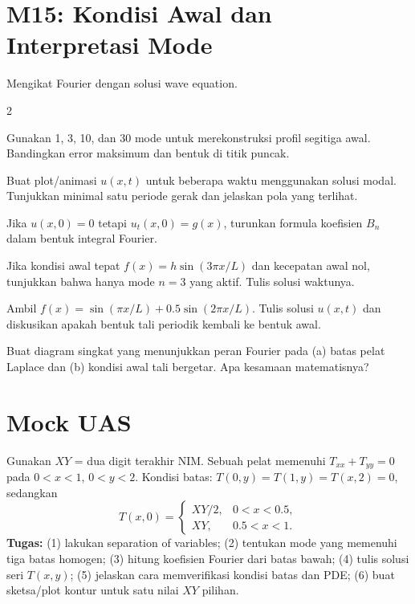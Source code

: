 \documentclass[10pt,a4paper]{article}
\newcommand{\level}[1]{\colorbox{levelbg}{\scriptsize\strut #1}}
\newcommand{\src}[1]{\colorbox{sourcebg}{\scriptsize\strut #1}}
\begin{document}
\section*{M15: Kondisi Awal dan Interpretasi Mode}
{\color{iteraGray}\small Mengikat Fourier dengan solusi wave equation.}\par\vspace{1mm}
\begin{multicols}{2}
\begin{qbox}[title={M15.1: Rekonstruksi simpangan awal\hfill \level{L3}\;\src{Var}}]
\small Gunakan 1, 3, 10, dan 30 mode untuk merekonstruksi profil segitiga awal. Bandingkan error maksimum dan bentuk di titik puncak.
\end{qbox}
\begin{qbox}[title={M15.2: Animasi tali\hfill \level{L2}\;\src{PR}}]
\small Buat plot/animasi $u(x,t)$ untuk beberapa waktu menggunakan solusi modal. Tunjukkan minimal satu periode gerak dan jelaskan pola yang terlihat.
\end{qbox}
\begin{qbox}[title={M15.3: Kecepatan awal nonnol\hfill \level{L3}\;\src{Var}}]
\small Jika $u(x,0)=0$ tetapi $u_t(x,0)=g(x)$, turunkan formula koefisien $B_n$ dalam bentuk integral Fourier.
\end{qbox}
\begin{qbox}[title={M15.4: Mode tunggal\hfill \level{L2}\;\src{Var}}]
\small Jika kondisi awal tepat $f(x)=h\sin(3\pi x/L)$ dan kecepatan awal nol, tunjukkan bahwa hanya mode $n=3$ yang aktif. Tulis solusi waktunya.
\end{qbox}
\begin{qbox}[title={M15.5: Superposisi dua mode\hfill \level{L3}\;\src{Var}}]
\small Ambil $f(x)=\sin(\pi x/L)+0.5\sin(2\pi x/L)$. Tulis solusi $u(x,t)$ dan diskusikan apakah bentuk tali periodik kembali ke bentuk awal.
\end{qbox}
\begin{qbox}[title={M15.6: Hubungan Fourier-BVP-Wave\hfill \level{L2}\;\src{Var}}]
\small Buat diagram singkat yang menunjukkan peran Fourier pada (a) batas pelat Laplace dan (b) kondisi awal tali bergetar. Apa kesamaan matematisnya?
\end{qbox}
\end{multicols}
\newpage
\section*{Mock UAS}
\begin{exam}[title={Mock UAS A - Pelat dengan batas bawah piecewise}]
Gunakan $XY$ = dua digit terakhir NIM. Sebuah pelat memenuhi $T_{xx}+T_{yy}=0$ pada $0<x<1$, $0<y<2$. Kondisi batas: $T(0,y)=T(1,y)=T(x,2)=0$, sedangkan
\[
T(x,0)=\begin{cases}XY/2,&0<x<0.5,\\XY,&0.5<x<1.\end{cases}
\]
\textbf{Tugas:} (1) lakukan separation of variables; (2) tentukan mode yang memenuhi tiga batas homogen; (3) hitung koefisien Fourier dari batas bawah; (4) tulis solusi seri $T(x,y)$; (5) jelaskan cara memverifikasi kondisi batas dan PDE; (6) buat sketsa/plot kontur untuk satu nilai $XY$ pilihan.
\end{exam}
\end{document}

